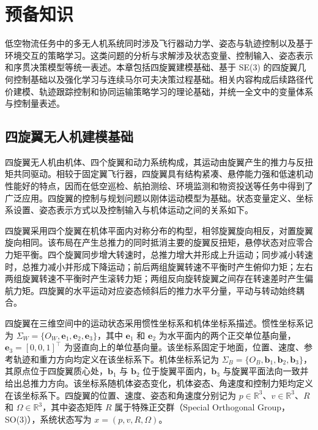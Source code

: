\chapter{预备知识}

低空物流任务中的多无人机系统同时涉及飞行器动力学、姿态与轨迹控制以及基于环境交互的策略学习。这类问题的分析与求解涉及状态变量、控制输入、姿态表示和序贯决策模型等统一表述。本章包括四旋翼建模基础、基于 SE(3) 的四旋翼几何控制基础以及强化学习与连续马尔可夫决策过程基础。相关内容构成后续路径代价建模、轨迹跟踪控制和协同运输策略学习的理论基础，并统一全文中的变量体系与控制量表述。

\section{四旋翼无人机建模基础}

四旋翼无人机由机体、四个旋翼和动力系统构成，其运动由旋翼产生的推力与反扭矩共同驱动。相较于固定翼飞行器，四旋翼具有结构紧凑、悬停能力强和低速机动性能好的特点，因而在低空巡检、航拍测绘、环境监测和物资投送等任务中得到了广泛应用。四旋翼的控制与规划问题以刚体运动模型为基础。状态变量定义、坐标系设置、姿态表示方式以及控制输入与机体运动之间的关系如下。

四旋翼采用四个旋翼在机体平面内对称分布的构型，相邻旋翼旋向相反，对置旋翼旋向相同。该布局在产生总推力的同时抵消主要的旋翼反扭矩，悬停状态对应零合力矩平衡。四个旋翼同步增大转速时，总推力增大并形成上升运动；同步减小转速时，总推力减小并形成下降运动；前后两组旋翼转速不平衡时产生俯仰力矩；左右两组旋翼转速不平衡时产生滚转力矩；两组反向旋转旋翼之间存在转速差时产生偏航力矩。四旋翼的水平运动对应姿态倾斜后的推力水平分量，平动与转动始终耦合。

四旋翼在三维空间中的运动状态采用惯性坐标系和机体坐标系描述。惯性坐标系记为 $\Sigma_W=\{O_W,\mathbf e_1,\mathbf e_2,\mathbf e_3\}$，其中 $\mathbf e_1$ 和 $\mathbf e_2$ 为水平面内的两个正交单位基向量，$\mathbf e_3=[0,0,1]^\top$ 为竖直向上的单位基向量。该坐标系固定于地面，位置、速度、参考轨迹和重力方向均定义在该坐标系下。机体坐标系记为 $\Sigma_B=\{O_B,\mathbf b_1,\mathbf b_2,\mathbf b_3\}$，其原点位于四旋翼质心处，$\mathbf b_1$ 与 $\mathbf b_2$ 位于旋翼平面内，$\mathbf b_3$ 与旋翼平面法向一致并给出总推力方向。该坐标系随机体姿态变化，机体姿态、角速度和控制力矩均定义在该坐标系下。四旋翼的位置、速度、姿态和角速度分别记为 $p\in\mathbb R^3$、$v\in\mathbb R^3$、$R$ 和 $\Omega\in\mathbb R^3$，其中姿态矩阵 $R$ 属于特殊正交群（Special Orthogonal Group，SO(3)），系统状态写为 $x=(p,v,R,\Omega)$。


